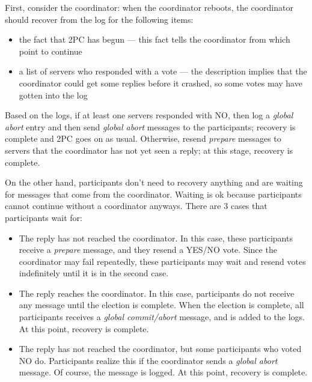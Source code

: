 First, consider the coordinator:
when the coordinator reboots, the coordinator should recover from the log for the following items:
\begin{itemize}
\item
the fact that 2PC has begun --- this fact tells the coordinator from which point to continue
\item
a list of servers who responded with a vote --- the description implies that the coordinator could get some replies before it crashed, so some votes may have gotten into the log
\end{itemize}
Based on the logs, if at least one servers responded with NO, then log a \emph{global abort} entry and then send \emph{global abort} messages to the participants; recovery is complete and 2PC goes on as usual.
Otherwise, resend \emph{prepare} messages to servers that the coordinator has not yet seen a reply; at this stage, recovery is complete.

On the other hand, participants don't need to recovery anything and are waiting for messages that come from the coordinator.
Waiting is ok because participants cannot continue without a coordinator anyways.
There are 3 cases that participants wait for:
\begin{itemize}
\item
The reply has not reached the coordinator.
In this case, these participants receive a \emph{prepare} message, and they resend a YES/NO vote.
Since the coordinator may fail repeatedly, these participants may wait and resend votes indefinitely until it is in the second case.
\item
The reply reaches the coordinator.
In this case, participants do not receive any message until the election is complete.
When the election is complete, all participants receives a \emph{global commit/abort} message, and is added to the logs.
At this point, recovery is complete.
\item
The reply has not reached the coordinator, but some participants who voted NO do.
Participants realize this if the coordinator sends a \emph{global abort} message.
Of course, the message is logged.
At this point, recovery is complete.
\end{itemize}
